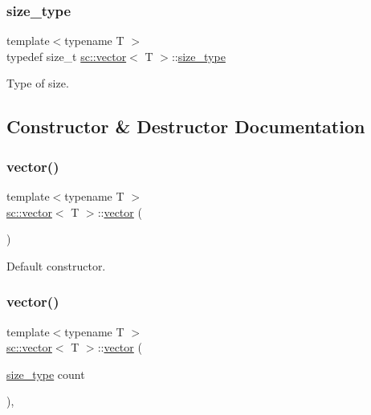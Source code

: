 \subsubsection{\texorpdfstring{size\+\_\+type}{size\_type}}
{\footnotesize\ttfamily template$<$typename T $>$ \\
typedef size\+\_\+t \hyperlink{classsc_1_1vector}{sc\+::vector}$<$ T $>$\+::\hyperlink{classsc_1_1vector_aa4500ebad5be45f8d469fc4b5d62b19d}{size\+\_\+type}\hspace{0.3cm}{\ttfamily [private]}}



Type of size. 



\subsection{Constructor \& Destructor Documentation}
\mbox{\label{classsc_1_1vector_a8ceb2f122374a0fe1c645ebe5e759279}} 
\subsubsection{\texorpdfstring{vector()}{vector()}\hspace{0.1cm}{\footnotesize\ttfamily [1/5]}}
{\footnotesize\ttfamily template$<$typename T $>$ \\
\hyperlink{classsc_1_1vector}{sc\+::vector}$<$ T $>$\+::\hyperlink{classsc_1_1vector}{vector} (\begin{DoxyParamCaption}{ }\end{DoxyParamCaption})\hspace{0.3cm}{\ttfamily [inline]}}



Default constructor. 

\mbox{\label{classsc_1_1vector_a641fcc38459aee8e3bdf86abb5f9d193}} 
\subsubsection{\texorpdfstring{vector()}{vector()}\hspace{0.1cm}{\footnotesize\ttfamily [2/5]}}
{\footnotesize\ttfamily template$<$typename T $>$ \\
\hyperlink{classsc_1_1vector}{sc\+::vector}$<$ T $>$\+::\hyperlink{classsc_1_1vector}{vector} (\begin{DoxyParamCaption}\item[{\hyperlink{classsc_1_1vector_aa4500ebad5be45f8d469fc4b5d62b19d}{size\+\_\+type}}]{count }\end{DoxyParamCaption})\hspace{0.3cm}{\ttfamily [inline]}, {\ttfamily [explicit]}}




